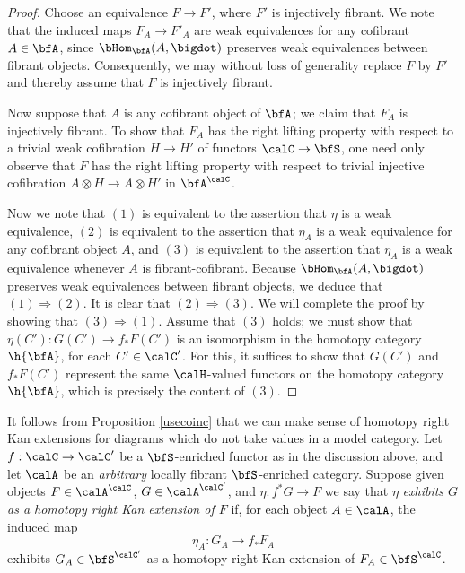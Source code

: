 \begin{Simplicial Categories}
\begin{proof}
Choose an equivalence $F \rightarrow F'$, where $F'$ is injectively fibrant. We note that
the induced maps $F_A \rightarrow F'_A$ are weak equivalences for any
cofibrant $A \in \bfA$, since $\bHom_{\bfA}(A, \bigdot)$ preserves weak equivalences between fibrant objects. Consequently, we may without loss of generality replace $F$ by $F'$ and thereby assume that $F$ is injectively fibrant.

Now suppose that $A$ is any cofibrant object of $\bfA$; we claim that
$F_A$ is injectively fibrant. To show that $F_A$ has
the right lifting property with respect to a trivial weak
cofibration $H \rightarrow H'$ of functors $\calC \rightarrow
\bfS$, one need only observe that $F$ has the right lifting
property with respect to trivial injective cofibration $A \otimes H
\rightarrow A \otimes H'$ in $\bfA^{\calC}$.

Now we note that $(1)$ is equivalent to the assertion that $\eta$ is a weak equivalence, $(2)$
is equivalent to the assertion that $\eta_{A}$ is a weak equivalence for any cofibrant object
$A$, and $(3)$ is equivalent to the assertion that $\eta_A$ is a weak equivalence whenever
$A$ is fibrant-cofibrant. Because $\bHom_{\bfA}(A, \bigdot)$ preserves weak equivalences between fibrant objects, we deduce that $(1) \Rightarrow (2)$. It is
clear that $(2) \Rightarrow (3)$. We will complete the proof by showing that $(3) \Rightarrow (1)$.
Assume that $(3)$ holds; we must show that
$\eta(C'): G(C') \rightarrow f_{\ast} F(C')$ is an isomorphism in the homotopy category $\h{\bfA}$,
for each $C' \in \calC'$.
For this, it suffices to show that $G(C')$ and $f_{\ast} F(C')$ represent the same $\calH$-valued functors on the homotopy category $\h{\bfA}$, which is precisely the content of $(3)$. 
\end{proof}

\begin{remark}\label{curble}
It follows from Proposition \ref{usecoinc} that we can make sense of homotopy right Kan extensions for diagrams
which do not take values in a model category. 
Let $f: \calC \rightarrow \calC'$ be a $\bfS$-enriched functor as in the discussion above, and let $\calA$ be an {\em arbitrary} locally fibrant $\bfS$-enriched category. Suppose given objects $F \in \calA^{\calC}$, $G \in \calA^{\calC'}$, and $\eta: f^{\ast} G \rightarrow F$
we say that $\eta$ {\it exhibits $G$ as a homotopy right
Kan extension of $F$} if, for each object $A \in \calA$, the induced map
$$\eta_A: G_A \rightarrow f_{\ast} F_A$$ exhibits $G_A \in \bfS^{\calC'}$ as a homotopy right Kan extension of $F_A \in \bfS^{\calC}$.


\end{remark}
\end{Simplicial Categories}
